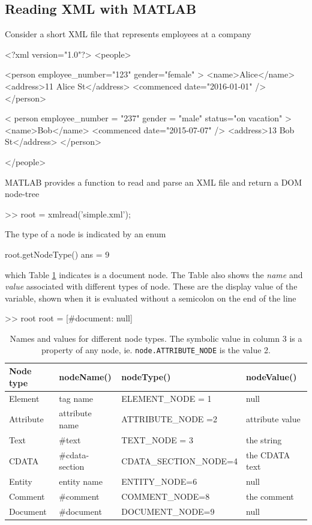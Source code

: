 \subsection{Reading XML with MATLAB}
Consider a short XML file that represents employees at a company
\begin{XMLNum}
<?xml version="1.0"?>
<people>

  <person employee_number="123" gender="female" >
    <name>Alice</name>
    <address>11 Alice St</address>
    <commenced date="2016-01-01" />
  </person>

  < person employee_number =  "237" gender = "male" status="on vacation" >
    <name>Bob</name>
    <commenced date="2015-07-07" />
    <address>13  Bob St</address>
  </person>

</people>
\end{XMLNum}


MATLAB provides a function to read and parse an XML file and return a DOM node-tree
\begin{Code}
>> root = xmlread('simple.xml');
\end{Code}
The type of a node is indicated by an enum  
\begin{Code}
root.getNodeType()
ans =
    9
\end{Code}
which Table \ref{tab:values} indicates is a document node.
The Table also shows the \emph{name} and \emph{value} associated with different types of node.
These are the display value of the variable, shown when it is evaluated without  a semicolon on the end of the line
\begin{Code}
>> root
root =
[#document: null]
\end{Code}

\begin{table}
\begin{tabular}{|l|l|l|l|} \hline
Node type & nodeName() & nodeType() & nodeValue()  \\ \hline\hline
Element  & tag name & ELEMENT\_NODE = 1  & null\\
Attribute  & attribute name & ATTRIBUTE\_NODE =2 &  attribute value\\
Text  & \#text & TEXT\_NODE = 3  & the string \\
CDATA  &  \#cdata-section & CDATA\_SECTION\_NODE=4  & the CDATA text \\
Entity  & entity name & ENTITY\_NODE=6  & null \\
Comment  & \#comment & COMMENT\_NODE=8  & the comment\\
Document  & \#document & DOCUMENT\_NODE=9  & null\\ \hline
\end{tabular}
\caption{Names and values for different node types.  The symbolic value in column 3 is a property of any node, ie. \texttt{node.ATTRIBUTE\_NODE} is the value 2.}\label{tab:values}
\end{table}


